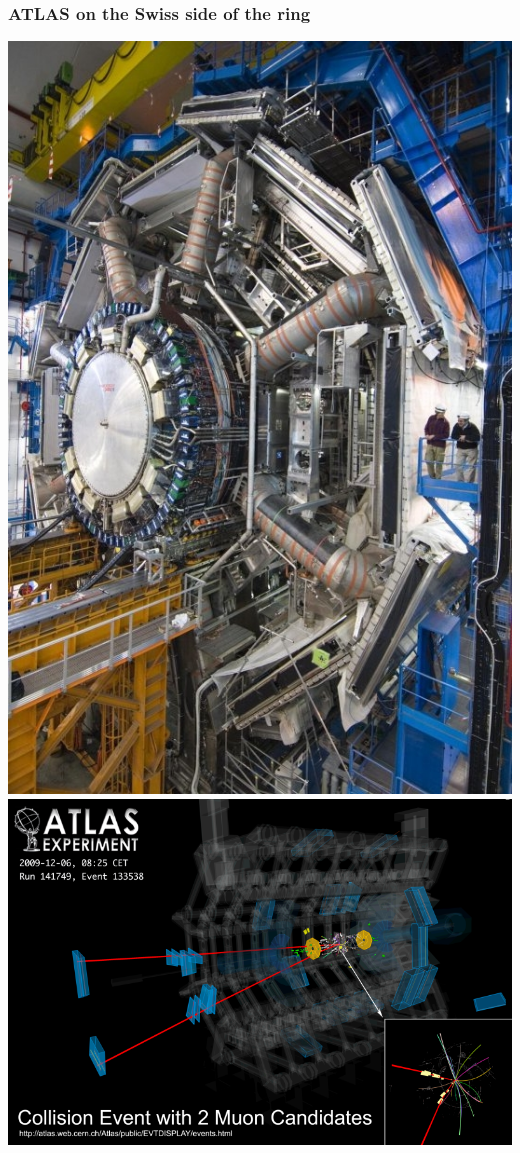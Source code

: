 \documentclass[compress]{beamer}
\begin{document}
\begin{frame}
\frametitle{ATLAS on the Swiss side of the ring}

\includegraphics[height=5.1 cm]{atlas2.jpg} \hspace{0.2 cm}
\mbox{\includegraphics[height=5.1 cm]{atlas_dimuon.png} \hspace{-1 cm}}

\vfill
{}
\end{frame}
\end{document}
